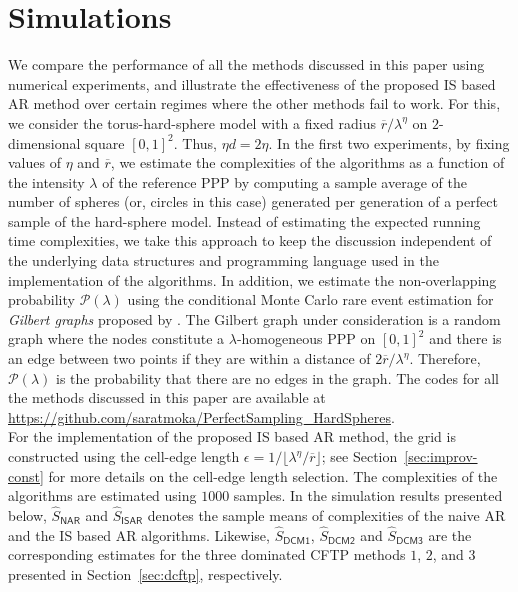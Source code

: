 \documentclass[11pt]{article}
\newcommand{\rbdd}{\overline{r}}
\newcommand{\wh}{\widehat}
\newcommand{\pno}{\mathcal{P}(\lambda)}
\begin{document}
\section{Simulations}
\label{sec:NumExp}
We compare the performance of all the methods discussed in this paper using numerical experiments, and illustrate the effectiveness of the proposed IS based AR method over certain regimes where the other methods fail to work. For this, we consider {the torus-hard-sphere model} with a {fixed radius $\rbdd/\lambda^\eta$ on $2$-dimensional square $[0,1]^2$}. Thus, $\eta d = 2\eta$. In the first two experiments, by  fixing values of $\eta$ and $\rbdd$, we estimate the complexities of the algorithms as a function of the intensity $\lambda$ of the reference PPP by computing a sample average of the number of spheres (or, circles in this case) generated per generation of a perfect sample of the hard-sphere model. Instead of estimating the expected running time complexities, we take this approach to keep the discussion independent of the underlying data structures and programming language used in the implementation of the algorithms. In addition, we estimate the non-overlapping probability $\pno$ using the conditional Monte Carlo rare event estimation for {\em Gilbert graphs} proposed by \cite{HMTK20}. The Gilbert graph under consideration is a random graph where the nodes constitute a $\lambda$-homogeneous PPP on $[0,1]^2$ and there is an edge between two points if they are within a distance of $2\rbdd/\lambda^\eta$. Therefore, $\pno$ is the probability that there are no edges in the graph. The codes for all the methods discussed in this paper are available at \href{https://github.com/saratmoka/PerfectSampling_HardSpheres}{https://github.com/saratmoka/PerfectSampling\_HardSpheres}. \\

For the implementation of the proposed IS based AR method, the grid is constructed using the cell-edge length $\epsilon = 1/\lfloor \lambda^\eta/\rbdd\rfloor$; see Section~\ref{sec:improv-const} for more details on the cell-edge length selection. 
The complexities of the algorithms are estimated using $1000$ samples. In the simulation results presented below, $\wh S_{\mathsf{NAR}}$ and $\wh S_{\mathsf{ISAR}}$ denotes the sample means of complexities of the naive AR and the IS based AR algorithms. Likewise, $\wh S_{\mathsf{DCM1}}$,  $\wh S_{\mathsf{DCM2}}$ and  $\wh S_{\mathsf{DCM3}}$ are the corresponding estimates for the three dominated CFTP methods $1$, $2$, and $3$ presented in Section~\ref{sec:dcftp}, respectively. \\
\end{document}
